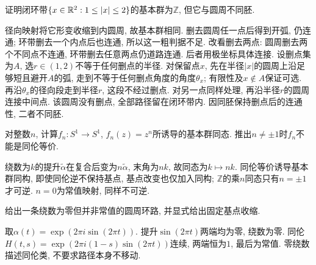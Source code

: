 \begin{exercise}
证明闭环带$\{x\in\mathbb R^2:1\le|x|\le2\}$的基本群为$\mathbb Z$, 但它与圆周不同胚.
\end{exercise}
\begin{solution}
径向映射将它形变收缩到内圆周, 故基本群相同. 删去圆周任一点后得到开弧, 仍连通; 环带删去一个内点后也连通, 所以这一粗判据不足. 改看删去两点: 圆周删去两个不同点不连通, 环带删去任意两点仍道路连通. 后者用极坐标具体连接. 设删点集为$A$, 选$r\in(1,2)$不等于任何删点的半径. 对保留点$x$, 先在半径$|x|$的圆周上沿足够短且避开$A$的弧, 走到不等于任何删点角度的角度$\theta_x$; 有限性及$x\notin A$保证可选. 再沿$\theta_x$的径向段走到半径$r$, 这段不经过删点. 对另一点同样处理, 再沿半径$r$的圆周连接中间点. 该圆周没有删点, 全部路径留在闭环带内. 因同胚保持删点后的连通性, 二者不同胚.
\end{solution}
\begin{exercise}
对整数$n$, 计算$f_n:S^1\to S^1$, $f_n(z)=z^n$所诱导的基本群同态. 推出$n\ne\pm1$时$f_n$不能是同伦等价.
\end{exercise}
\begin{solution}
绕数为$k$的提升$\widetilde\alpha$在复合后变为$n\widetilde\alpha$, 末角为$nk$, 故同态为$k\mapsto nk$. 同伦等价诱导基本群同构, 即使同伦逆不保持基点, 基点改变也仅加入同构; $\mathbb Z$的乘$n$同态只有$n=\pm1$才可逆. $n=0$为常值映射, 同样不可逆.
\end{solution}
\begin{exercise}
给出一条绕数为零但并非常值的圆周环路, 并显式给出固定基点收缩.
\end{exercise}
\begin{solution}
取$\alpha(t)=\exp(2\pi i\sin(2\pi t))$. 提升$\sin(2\pi t)$两端均为零, 绕数为零. 同伦$H(t,s)=\exp(2\pi i(1-s)\sin(2\pi t))$连续, 两端恒为$1$, 最后为常值. 零绕数描述同伦类, 不要求路径本身不移动.
\end{solution}
